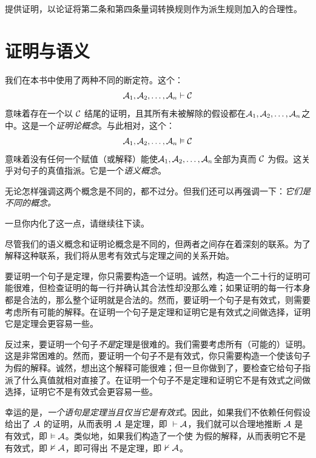 \practiceproblems
\problempart
提供证明，以论证将第二条和第四条量词转换规则作为派生规则加入的合理性。

\chapter{证明与语义}
我们在本书中使用了两种不同的断定符。这个：
$$\mathcal{A}_1, \mathcal{A}_2, \ldots, \mathcal{A}_n \vdash \mathcal{C}$$
意味着存在一个以 $\mathcal{C}$ 结尾的证明，且其所有未被解除的假设都在$\mathcal{A}_1, \mathcal{A}_2, \ldots, \mathcal{A}_n$之中。这是一个\emph{证明论概念}。与此相对，这个：
$$\mathcal{A}_1, \mathcal{A}_2, \ldots, \mathcal{A}_n \vDash \mathcal{C}$$
意味着没有任何一个赋值（或解释）能使$\mathcal{A}_1, \mathcal{A}_2, \ldots, \mathcal{A}_n$全部为真而 $\mathcal{C}$ 为假。这关乎对句子的真值指派。它是一个\emph{语义概念}。

无论怎样强调这两个概念是不同的，都不过分。但我们还可以再强调一下：\emph{它们是不同的概念。}

一旦你内化了这一点，请继续往下读。

尽管我们的语义概念和证明论概念是不同的，但两者之间存在着深刻的联系。为了解释这种联系，我们将从思考有效式与定理之间的关系开始。

要证明一个句子是定理，你只需要构造一个证明。诚然，构造一个二十行的证明可能很难，但检查证明的每一行并确认其合法性却没那么难；如果证明的每一行本身都是合法的，那么整个证明就是合法的。然而，要证明一个句子是有效式，则需要考虑所有可能的解释。在证明一个句子是定理和证明它是有效式之间做选择，证明它是定理会更容易一些。

反过来，要证明一个句子\emph{不是}定理是很难的。我们需要考虑所有（可能的）证明。这是非常困难的。然而，要证明一个句子不是有效式，你只需要构造一个使该句子为假的解释。诚然，想出这个解释可能很难；但一旦你做到了，要检查它给句子指派了什么真值就相对直接了。在证明一个句子不是定理和证明它不是有效式之间做选择，证明它不是有效式会更容易一些。

幸运的是，\emph{一个语句是定理当且仅当它是有效式}。因此，如果我们不依赖任何假设给出了 $\mathcal{A}$ 的证明，从而表明 $\mathcal{A}$ 是定理，即 ${}\vdash \mathcal{A}$，我们就可以合理地推断 $\mathcal{A}$ 是有效式，即 $\vDash\mathcal{A}$。类似地，如果我们构造了一个使  为假的解释，从而表明它不是有效式，即 $\nvDash \mathcal{A}$，即可得出  不是定理，即 $\nvdash \mathcal{A}$。

